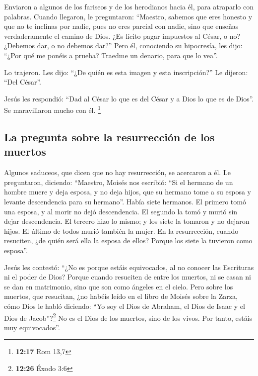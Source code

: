 \begin{paracol}{2}
 Enviaron a algunos de los fariseos y de los herodianos
hacia él, para atraparlo con palabras.  Cuando llegaron,
le preguntaron: ``Maestro, sabemos que eres honesto y que no te inclinas
por nadie, pues no eres parcial con nadie, sino que enseñas
verdaderamente el camino de Dios. ¿Es lícito pagar impuestos al César, o
no?  ¿Debemos dar, o no debemos dar?'' Pero él,
conociendo su hipocresía, les dijo: ``¿Por qué me ponéis a prueba?
Traedme un denario, para que lo vea''.

 Lo trajeron. Les dijo: ``¿De quién es esta imagen y esta
inscripción?'' Le dijeron: ``Del César''.

 Jesús les respondió: ``Dad al César lo que es del César
y a Dios lo que es de Dios''. Se maravillaron mucho con él. \footnote{\textbf{12:17}
  Rom 13,7}

\hypertarget{la-pregunta-sobre-la-resurrecciuxf3n-de-los-muertos}{%
\subsection{La pregunta sobre la resurrección de los
muertos}\label{la-pregunta-sobre-la-resurrecciuxf3n-de-los-muertos}}

 Algunos saduceos, que dicen que no hay resurrección, se
acercaron a él. Le preguntaron, diciendo:  ``Maestro,
Moisés nos escribió: ``Si el hermano de un hombre muere y deja esposa, y
no deja hijos, que su hermano tome a su esposa y levante descendencia
para su hermano''.  Había siete hermanos. El primero tomó
una esposa, y al morir no dejó descendencia.  El segundo
la tomó y murió sin dejar descendencia. El tercero hizo lo mismo;
 y los siete la tomaron y no dejaron hijos. El último de
todos murió también la mujer.  En la resurrección, cuando
resuciten, ¿de quién será ella la esposa de ellos? Porque los siete la
tuvieron como esposa''.

 Jesús les contestó: ``¿No es porque estáis equivocados,
al no conocer las Escrituras ni el poder de Dios?  Porque
cuando resuciten de entre los muertos, ni se casan ni se dan en
matrimonio, sino que son como ángeles en el cielo.  Pero
sobre los muertos, que resucitan, ¿no habéis leído en el libro de Moisés
sobre la Zarza, cómo Dios le habló diciendo: ``Yo soy el Dios de
Abraham, el Dios de Isaac y el Dios de Jacob''?\footnote{\textbf{12:26}
  Éxodo 3:6}  No es el Dios de los muertos, sino de los
vivos. Por tanto, estáis muy equivocados''.


\end{paracol}
